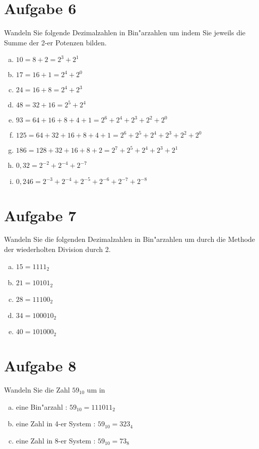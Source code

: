 \documentclass[10pt, oneside]{article}
\begin{document}
\section{Aufgabe 6}

Wandeln Sie folgende Dezimalzahlen in Bin"arzahlen um indem Sie jeweils die
Summe der 2-er Potenzen bilden.
\begin{enumerate}[(a)]
    \item $10 = 8 + 2 = 2^3 + 2^1$
    \item $17 = 16 + 1 = 2^4 + 2^0$
    \item $24 = 16 + 8 = 2^4 + 2^3$
    \item $48 = 32 + 16 = 2^5 + 2^4$
    \item $93 = 64 + 16 + 8 + 4 + 1 = 2^6 + 2^4 + 2^3 + 2^2 + 2^0$
    \item $125 = 64 + 32 + 16 + 8 + 4 + 1 = 2^6 + 2^5 + 2^4 + 2^3 + 2^2 + 2^0$
    \item $186 = 128 + 32 + 16 + 8 + 2 = 2^7 + 2^5 + 2^4 + 2^3 + 2^1$
    \item $0,32 = 2^{-2} + 2^{-4} + 2^{-7}$
    \item $0,246 = 2^{-3} + 2^{-4} + 2^{-5} + 2^{-6} + 2^{-7} + 2^{-8}$
\end{enumerate}

\section{Aufgabe 7}

Wandeln Sie die folgenden Dezimalzahlen in Bin"arzahlen um durch die Methode der
wiederholten Division durch 2.
\begin{enumerate}[(a)]
    \item $15 = 1111_2$
    \item $21 = 10101_2$
    \item $28 = 11100_2$
    \item $34 = 100010_2$
    \item $40 = 101000_2$
\end{enumerate}

\section{Aufgabe 8}

Wandeln Sie die Zahl $59_{10}$ um in
\begin{enumerate}[(a)]
    \item eine Bin"arzahl : $59_{10} = 111011_2$
    \item eine Zahl in 4-er System : $59_{10} = 323_4$
    \item eine Zahl in 8-er System : $59_{10} = 73_8$
\end{enumerate}
\end{document}
